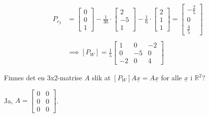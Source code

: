 \documentclass[11pt, a4paper, norsk]{NTNUoving}
\begin{document}
\begin{oppgave}
\begin{punkt}
\begin{align*}
                \\
                \\
                        P_{\underline{e_{3}}} &= \begin{bmatrix}
                    0 \\ 
                    0 \\
                    1
                \end{bmatrix} - \frac{1}{30} \cdot \begin{bmatrix}
                    2 \\
                    -5 \\
                    1
                \end{bmatrix} - \frac{1}{6} \cdot \begin{bmatrix}
                    2 \\
                    1 \\
                    1
                \end{bmatrix} = \begin{bmatrix}
                    -\frac{2}{5} \\
                    0 \\
                    \frac{4}{5}
                \end{bmatrix}
                \\
                \\
                                     &\implies [P_{W}] = \frac{1}{5} \begin{bmatrix}
                                         1 & 0 & -2 \\
                                         0 & -5 & 0 \\
                                         -2 & 0 & 4
                                     \end{bmatrix}
            \end{align*}
        \end{punkt}
        \begin{punkt}
            Finnes det en $3$x$2$-matrise $A$ slik at $[P_{W}]A\underline{x} = A\underline{x}$ for alle $\underline{x}$ i $\mathbb{R}^2$?

            Ja, $A = \begin{bmatrix}
                0 & 0 \\
                0 & 0 \\
                0 & 0
            \end{bmatrix}$.
        \end{punkt}
    \end{oppgave}
\end{document}
